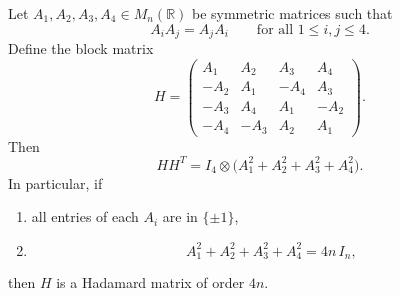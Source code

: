 \documentclass[11pt, a4paper]{ctexrep}
\begin{document}
\begin{theorem}[Williamson, 1944]
    Let \(A_1,A_2,A_3,A_4\in M_n(\mathbb{R})\) be symmetric matrices such that
    \[
        A_iA_j=A_jA_i
        \qquad\text{for all }1\le i,j\le 4.
    \]
    Define the block matrix
    \[
        H=
        \begin{pmatrix}
            A_1  & A_2  & A_3  & A_4  \\
            -A_2 & A_1  & -A_4 & A_3  \\
            -A_3 & A_4  & A_1  & -A_2 \\
            -A_4 & -A_3 & A_2  & A_1
        \end{pmatrix}.
    \]
    Then
    \[
        HH^T=I_4\otimes\bigl(A_1^2+A_2^2+A_3^2+A_4^2\bigr).
    \]
    In particular, if
    \begin{enumerate}
        \item all entries of each \(A_i\) are in \(\{\pm1\}\),
        \item
              \[
                  A_1^2+A_2^2+A_3^2+A_4^2=4n\,I_n,
              \]
    \end{enumerate}
    then \(H\) is a Hadamard matrix of order \(4n\).
\end{theorem}
\end{document}

